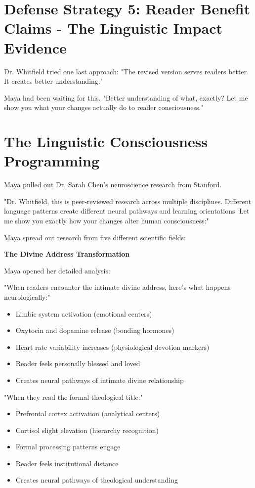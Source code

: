 \documentclass[11pt,twoside]{book}
\begin{document}
\section*{Defense Strategy 5: Reader Benefit Claims - The Linguistic Impact Evidence}
\label{sec:org5404370}

Dr. Whitfield tried one last approach: "The revised version serves readers better. It creates better understanding."

Maya had been waiting for this. "Better understanding of what, exactly? Let me show you what your changes actually do to reader consciousness."
\section*{The Linguistic Consciousness Programming}
\label{sec:org43e1b2b}

Maya pulled out Dr. Sarah Chen's neuroscience research from Stanford.

"Dr. Whitfield, this is peer-reviewed research across multiple disciplines. Different language patterns create different neural pathways and learning orientations. Let me show you exactly how your changes alter human consciousness:"

Maya spread out research from five different scientific fields:

\textbf{\textbf{The Divine Address Transformation}}

Maya opened her detailed analysis:

"When readers encounter the intimate divine address, here's what happens neurologically:"
\begin{itemize}
\item Limbic system activation (emotional centers)
\item Oxytocin and dopamine release (bonding hormones)
\item Heart rate variability increases (physiological devotion markers)
\item Reader feels personally blessed and loved
\item Creates neural pathways of intimate divine relationship
\end{itemize}

"When they read the formal theological title:"
\begin{itemize}
\item Prefrontal cortex activation (analytical centers)
\item Cortisol slight elevation (hierarchy recognition)
\item Formal processing patterns engage
\item Reader feels institutional distance
\item Creates neural pathways of theological understanding
\end{itemize}
\end{document}
